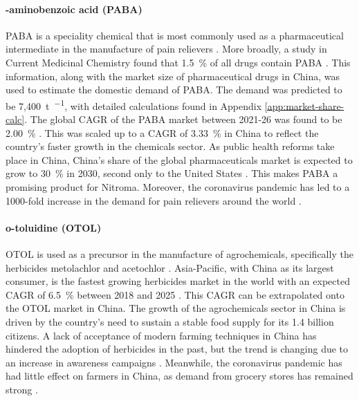 \paragraph{\para-aminobenzoic acid (PABA)}
PABA is a speciality chemical that is most commonly used as a pharmaceutical intermediate in the manufacture of pain relievers \cite{pubchem_compound_2021}. More broadly, a study in Current Medicinal Chemistry found that \SI{1.5}{\percent} of all drugs contain PABA \cite{kluczyk_drug_2002}. This information, along with the market size of pharmaceutical drugs in China, was used to estimate the domestic demand of PABA. The demand was predicted to be 7,\SI{400}{\tonne\per\year}, with detailed calculations found in Appendix \ref{app:market-share-calc}. The global CAGR of the PABA market between 2021-26 was found to be \SI{2.00}{\percent} \cite{wboc_global_2021}. This was scaled up to a CAGR of \SI{3.33}{\percent} in China to reflect the country’s faster growth in the chemicals sector. As public health reforms take place in China, China’s share of the global pharmaceuticals market is expected to grow to \SI{30}{\percent} in 2030, second only to the United States \cite{allison_chinas_2021}. This makes PABA a promising product for Nitroma. Moreover, the coronavirus pandemic has led to a 1000-fold increase in the demand for pain relievers around the world \cite{beroe_inc_coronavirus_2020}.

\paragraph{o-toluidine (OTOL)}
OTOL is used as a precursor in the manufacture of agrochemicals, specifically the herbicides metolachlor and acetochlor \cite{ncbi_ortho-toluidine_nodate}. Asia-Pacific, with China as its largest consumer, is the fastest growing herbicides market in the world with an expected CAGR of \SI{6.5}{\percent} between 2018 and 2025 \cite{sumant_herbicides_2019}. This CAGR can be extrapolated onto the OTOL market in China. The growth of the agrochemicals sector in China is driven by the country’s need to sustain a stable food supply for its 1.4 billion citizens. A lack of acceptance of modern farming techniques in China has hindered the adoption of herbicides in the past, but the trend is changing due to an increase in awareness campaigns \cite{mordor_intelligence_china_2019}. Meanwhile, the coronavirus pandemic has had little effect on farmers in China, as demand from grocery stores has remained strong \cite{mordor_intelligence_china_2019}.

